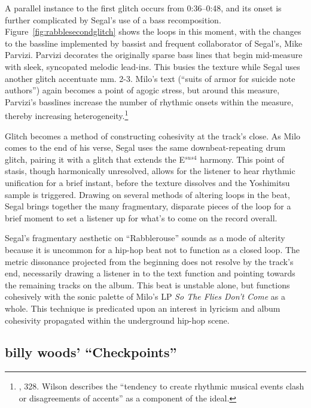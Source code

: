 A parallel instance to the first glitch occurs from 0:36--0:48, and its onset is further complicated
by Segal's use of a bass recomposition. Figure~\ref{fig:rabblesecondglitch} shows the loops in this 
moment, with the changes to the bassline implemented by bassist and frequent collaborator of Segal's, 
Mike Parvizi. Parvizi decorates the originally sparse bass lines that begin mid-measure with sleek,
syncopated melodic lead-ins. This busies the texture while Segal uses another glitch accentuate
mm. 2-3. Milo's text (``suits of armor for suicide note authors'') again becomes a point of agogic 
stress, but around this measure, Parvizi's basslines increase the number of rhythmic onsets within 
the measure, thereby increasing heterogeneity.\footnote{
    \cite{ollywilsonHeterogeneousSoundIdeal1992}, 328. Wilson describes the ``tendency to create 
    rhythmic musical events clash or disagreements of accents'' as a component of the ideal.}

Glitch becomes a method of constructing cohesivity at the track's close. As Milo comes to the end
of his verse, Segal uses the same downbeat-repeating drum glitch, pairing it with a glitch that 
extends the E$^{sus4}$ harmony. This point of stasis, though harmonically unresolved, allows
for the listener to hear rhythmic unification for a brief instant, before the texture dissolves and
the Yoshimitsu sample is triggered. Drawing on several methods of altering loops in the beat, Segal
brings together the many fragmentary, disparate pieces of the loop for a brief moment to set a 
listener up for what's to come on the record overall.

Segal's fragmentary aesthetic on ``Rabblerouse'' sounds as a mode of alterity because it is uncommon
for a hip-hop beat not to function as a closed loop. The metric dissonance projected from the 
beginning does not resolve by the track's end, necessarily drawing a listener in to the text function
and pointing  towards the remaining tracks on the album. This beat is unstable alone, but functions 
cohesively with the sonic palette of Milo's LP \textit{So The Flies Don't Come} as a whole. This 
technique is predicated  upon an interest in lyricism and album cohesivity propagated within the
underground hip-hop scene.

\subsection*{\centering billy woods' ``Checkpoints''}


